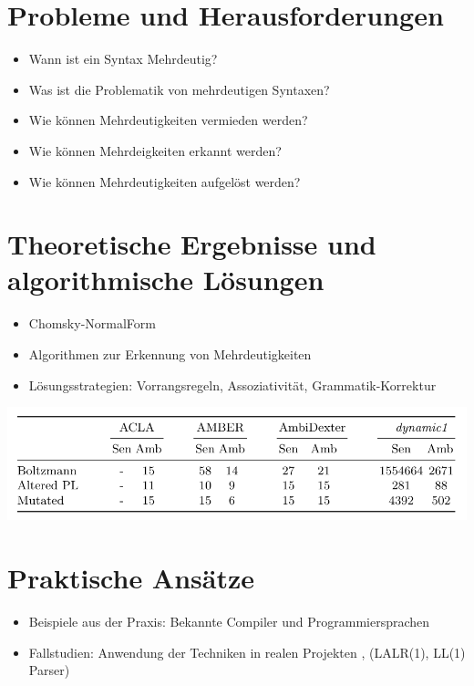 \documentclass[t]{beamer}
\begin{document}
	\section{Probleme und Herausforderungen}\label{sec:probleme-und-herausforderungen}
	\begin{frame}
		\begin{itemize}
			\item Wann ist ein Syntax Mehrdeutig?
			\item Was ist die Problematik von mehrdeutigen Syntaxen?
			\item Wie können Mehrdeutigkeiten vermieden werden?
			\item Wie können Mehrdeigkeiten erkannt werden?
			\item Wie können Mehrdeutigkeiten aufgelöst werden?
		\end{itemize}
	\end{frame}


	\section{Theoretische Ergebnisse und algorithmische Lösungen}\label{sec:theoretische-ergebnisse-und-algorithmische-losungen}
	\begin{frame}
		\begin{itemize}
			\item Chomsky-NormalForm
			\item Algorithmen zur Erkennung von Mehrdeutigkeiten
			\item Lösungsstrategien: Vorrangsregeln, Assoziativität, Grammatik-Korrektur
		\end{itemize}
		\begin{center}
			\includegraphics[width=\textwidth]{./img}\cite{springer2013}
		\end{center}
	\end{frame}


	\section{Praktische Ansätze}\label{sec:praktische-ansatze}
	\begin{frame}
		\begin{itemize}
			\item Beispiele aus der Praxis: Bekannte Compiler und Programmiersprachen
			\item Fallstudien: Anwendung der Techniken in realen Projekten , (LALR(1), LL(1) Parser)
		\end{itemize}
	\end{frame}
\end{document}
